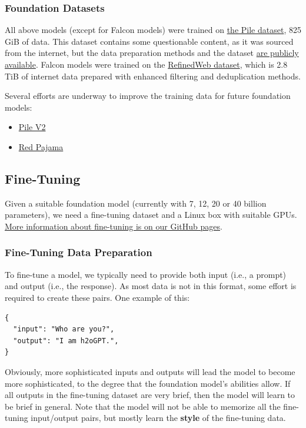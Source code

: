 \documentclass{article}
\begin{document}
\subsubsection{Foundation Datasets}

All above models (except for Falcon models) were trained on \href{https://www.arxiv-vanity.com/papers/2101.00027/}{the Pile dataset}, 825 GiB of data. This dataset contains some questionable content, as it was sourced from the internet, but the data preparation methods and the dataset \href{https://github.com/EleutherAI/the-pile}{are publicly available}. Falcon models were trained on the \href{https://arxiv.org/pdf/2306.01116.pdf}{RefinedWeb dataset}, which is 2.8 TiB of internet data prepared with enhanced filtering and deduplication methods.

Several efforts are underway to improve the training data for future foundation models:
\begin{itemize}
    \item \href{https://huggingface.co/datasets/CarperAI/pilev2-dev}{Pile V2}
    \item \href{https://www.together.xyz/blog/redpajama}{Red Pajama}
\end{itemize}

\subsection{Fine-Tuning}
Given a suitable foundation model (currently with 7, 12, 20 or 40 billion parameters), we need a fine-tuning dataset and a Linux box with suitable GPUs. \href{https://github.com/h2oai/h2ogpt/blob/main/FINETUNE.md}{More information about fine-tuning is on our GitHub pages}.

\subsubsection{Fine-Tuning Data Preparation}
To fine-tune a model, we typically need to provide both input (i.e., a prompt) and output (i.e., the response). As most data is not in this format, some effort is required to create these pairs. One example of this:
\begin{verbatim}   
{
  "input": "Who are you?",
  "output": "I am h2oGPT.",
}
\end{verbatim}
Obviously, more sophisticated inputs and outputs will lead the model to become more sophisticated, to the degree that the foundation model's abilities allow. If all outputs in the fine-tuning dataset are very brief, then the model will learn to be brief in general. Note that the model will not be able to memorize all the fine-tuning input/output pairs, but mostly learn the \textbf{style} of the fine-tuning data.
\end{document}
